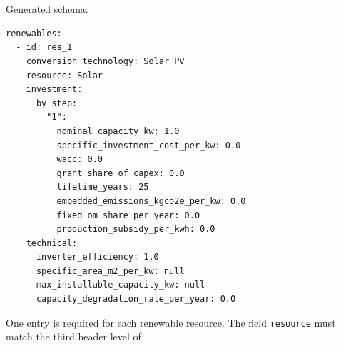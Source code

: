 \documentclass[11pt,a4paper]{report}
\newcommand{\code}[1]{\texttt{#1}}
\begin{document}
\section{}

Generated schema:

\begin{lstlisting}[style=mgpy]
renewables:
  - id: res_1
    conversion_technology: Solar_PV
    resource: Solar
    investment:
      by_step:
        "1":
          nominal_capacity_kw: 1.0
          specific_investment_cost_per_kw: 0.0
          wacc: 0.0
          grant_share_of_capex: 0.0
          lifetime_years: 25
          embedded_emissions_kgco2e_per_kw: 0.0
          fixed_om_share_per_year: 0.0
          production_subsidy_per_kwh: 0.0
    technical:
      inverter_efficiency: 1.0
      specific_area_m2_per_kw: null
      max_installable_capacity_kw: null
      capacity_degradation_rate_per_year: 0.0
\end{lstlisting}

One entry is required for each renewable resource. The field \code{resource} must match the third header level of .
\end{document}
